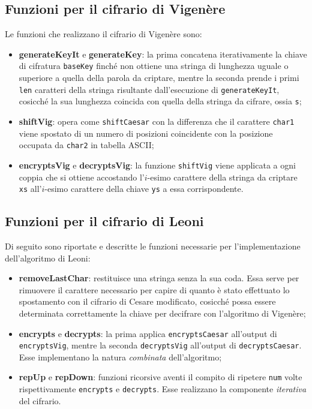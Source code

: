 \documentclass[a4paper, 12pt, one column, aas_macros]{article}
\begin{document}
	\subsection{Funzioni per il cifrario di Vigenère}
	Le funzioni che realizzano il cifrario di Vigenère sono:
	\begin{itemize}
		\item \textbf{generateKeyIt} e \textbf{generateKey}:  la prima concatena iterativamente la chiave di cifratura \verb|baseKey| finché non ottiene una stringa di lunghezza uguale o superiore a quella della parola da criptare, mentre la seconda prende i primi \verb|len| caratteri della stringa risultante dall'esecuzione di \verb|generateKeyIt|, cosicché la sua lunghezza coincida con quella della stringa da cifrare, ossia \verb|s|;
		
		\item \textbf{shiftVig}: opera come \verb|shiftCaesar| con la differenza che il carattere \verb|char1| viene spostato di un numero di posizioni coincidente con la posizione occupata da \verb|char2| in tabella ASCII;
		
		\item \textbf{encryptsVig} e \textbf{decryptsVig}: la funzione \verb|shiftVig| viene applicata a ogni coppia che si ottiene accostando l'$i$-esimo carattere della stringa da criptare \verb|xs| all'$i$-esimo carattere della chiave \verb|ys| a essa corrispondente.
	\end{itemize}
	
	\subsection{Funzioni per il cifrario di Leoni}
	Di seguito sono riportate e descritte le funzioni necessarie per l'implementazione dell'algoritmo di Leoni:
	\begin{itemize}
		\item \textbf{removeLastChar}: restituisce una stringa senza la sua coda. Essa serve per rimuovere il carattere necessario per capire di quanto è stato effettuato lo spostamento con il cifrario di Cesare modificato, cosicché possa essere determinata correttamente la chiave per decifrare con l'algoritmo di Vigenère;
		
		\item \textbf{encrypts} e \textbf{decrypts}: la prima applica \verb|encryptsCaesar| all'output di \verb|encryptsVig|, mentre la seconda \verb|decryptsVig| all'output di \verb|decryptsCaesar|. Esse implementano la natura \textit{combinata} dell'algoritmo;
		
		\item \textbf{repUp} e \textbf{repDown}: funzioni ricorsive aventi il compito di ripetere \verb|num| volte rispettivamente \verb|encrypts| e \verb|decrypts|. Esse realizzano la componente \textit{iterativa} del cifrario. 
	\end{itemize}
	
\end{document}
